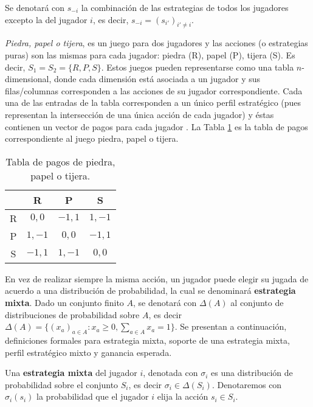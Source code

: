 Se denotará con $s_{-i}$ la combinación de las estrategias de todos los jugadores excepto la del jugador $i$, es decir, $s_{-i} = (s_{i'})_{i' \neq i}$.

\textit{Piedra, papel o tijera}, es un juego para dos jugadores y las acciones (o estrategias puras) son las mismas para cada jugador: piedra (R), papel (P), tijera (S). Es decir, $S_1 = S_2 = \{R, P, S \}$. Estos juegos pueden representarse como una tabla $n$-dimensional, donde cada dimensión está asociada a un jugador y sus filas/columnas corresponden a las acciones de su jugador correspondiente. Cada una de las entradas de la tabla corresponden a un único perfil estratégico (pues representan la intersección de una única acción de cada jugador) y éstas contienen un vector de pagos para cada jugador \cite{bib:introductionCFR}. La Tabla \ref{table:pago-RPS} es la tabla de pagos correspondiente al juego piedra, papel o tijera.

\begin{table}[h]
\begin{center}
\caption[Tabla de pagos de piedra, papel o tijera]{Tabla de pagos de piedra, papel o tijera. }
\label{table:pago-RPS}
\begin{tabular}{c | c | c | c |}
  & R & P & S \\ \hline
R & $0,0$ & $-1,1$ & $1,-1$ \\ \hline
P & $1,-1$ & $0,0$ & $-1,1$ \\ \hline
S & $-1,1$ & $1,-1$ & $0,0$ \\ \hline
\end{tabular}
\end{center}
\end{table}

En vez de realizar siempre la misma acción, un jugador puede elegir su jugada de acuerdo a una distribución de probabilidad, la cual se denominará \textbf{estrategia mixta}. Dado un conjunto finito $A$, se denotará con $\Delta(A)$ al conjunto de distribuciones de probabilidad sobre $A$, es decir $\Delta(A) = \{ (x_a)_{a \in A} : x_a \geq 0, \sum_{a \in A} x_a = 1\}$. Se presentan a continuación, definiciones formales para estrategia mixta, soporte de una estrategia mixta, perfil estratégico mixto y ganancia esperada.

\begin{definition} Una \textbf{estrategia mixta} del jugador $i$, denotada con $\sigma_i$ es una distribución de probabilidad sobre el conjunto $S_i$, es decir $\sigma_i \in \Delta(S_i)$. Denotaremos con $\sigma_i(s_i)$ la probabilidad que el jugador $i$ elija la acción $s_i \in S_i$. 
\end{definition}


